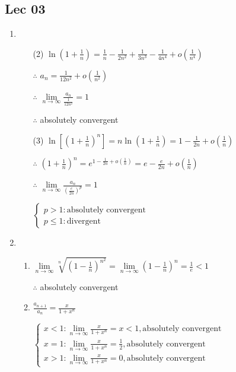 \subsection{Lec 03}

 \begin{enumerate}[1]
   \item
   \begin{enumerate}[(1)]
     \item[(2)]
     $\ln (1+\frac{1}{n})=\frac{1}{n}-\frac{1}{2n^2}+\frac{1}{3n^3}-\frac{1}{4n^4}+o(\frac{1}{n^4})$
     \par $\therefore$ $a_n=\frac{1}{12n^2}+o(\frac{1}{n^2})$
     \par $\therefore$ $\lim\limits_{n\rightarrow{\infty}}\frac{a_n}{\frac{1}{12n^2}}=1$
     \par $\therefore$ absolutely convergent

     \item[(3)]
     $\ln [(1+\frac{1}{n})^n]=n \ln (1+\frac{1}{n})=1-\frac{1}{2n}+o(\frac{1}{n})$
     \par $\therefore$ $(1+\frac{1}{n})^n=e^{1-\frac{1}{2n}+o(\frac{1}{n})}=e-\frac{e}{2n}+o(\frac{1}{n})$
     \par $\therefore$ $\lim\limits_{n\rightarrow{\infty}}\frac{a_n}{(\frac{e}{2n})^p}=1$
     \par $ \begin{cases} p>1:\text{absolutely convergent}\\ p \leqslant 1:\text{divergent} \end{cases} $
   \end{enumerate}

   \item
   \begin{enumerate}[(1)]
     \item
     $\lim\limits_{n\rightarrow{\infty}}\sqrt[n]{(1-\frac{1}{n})^{n^2}}=\lim\limits_{n\rightarrow{\infty}}(1-\frac{1}{n})^n=\frac{1}{e}<1$
     \par $\therefore$ absolutely convergent

     \item
     $\frac{a_{n+1}}{a_n}=\frac{x}{1+x^n}$
     \par $\begin{cases} x<1:\lim\limits_{n\rightarrow{\infty}}\frac{x}{1+x^n}=x<1,\text{absolutely convergent}
     \\x=1:\lim\limits_{n\rightarrow{\infty}}\frac{x}{1+x^n}=\frac{1}{2},\text{absolutely convergent}
     \\x>1:\lim\limits_{n\rightarrow{\infty}}\frac{x}{1+x^n}=0,\text{absolutely convergent} \end{cases}$
   \end{enumerate}


\end{enumerate}
